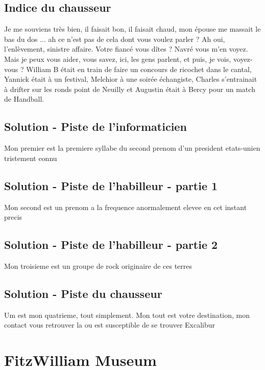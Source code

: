 \documentclass[12pt]{article}
\begin{document}
\subsection{Indice du chausseur}

Je me souviens très bien, il faisait bon, il faisait chaud, mon épouse me massait le bas du dos ... ah ce n'est pas de cela dont vous voulez parler ? Ah oui, l'enlèvement, sinistre affaire. Votre fiancé vous dîtes ? Navré vous m'en voyez. Mais je peux vous aider, vous savez, ici, les gens parlent, et puis, je vois, voyez-vous ?
William B était en train de faire un concours de ricochet dans le cantal, Yannick était à un festival, Melchior à une soirée échangiste, Charles s'entrainait à drifter sur les ronds point de Neuilly et Augustin était à Bercy pour un match de Handball.

\subsection{Solution - Piste de l'informaticien}

Mon premier est la premiere syllabe du second prenom d'un president etats-unien tristement connu


\subsection{Solution - Piste de l'habilleur - partie 1}

Mon second est un prenom a la frequence anormalement elevee en cet instant precis

\subsection{Solution - Piste de l'habilleur - partie 2}

Mon troisieme est un groupe de rock originaire de ces terres

\subsection{Solution - Piste du chausseur}

Um est mon quatrieme, tout simplement. Mon tout est votre destination, mon contact vous retrouver la ou est susceptible de se trouver Excalibur

\section{FitzWilliam Museum}
\end{document}
